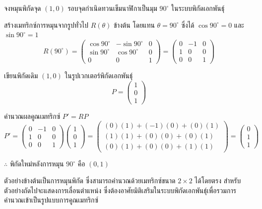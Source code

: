 \begin{ex}[การหมุนพิกัด 2 มิติ]
\label{ex:rotation-2d}
จงหมุนพิกัดจุด $(1, 0)$ รอบจุดกำเนิดทวนเข็มนาฬิกาเป็นมุม $90^\circ$ ในระบบพิกัดเอกพันธุ์
\end{ex}
\begin{solution}
สร้างเมทริกซ์การหมุนจากรูปทั่วไป $R(\theta)$ ข้างต้น โดยแทน $\theta = 90^\circ$ ซึ่งได้ $\cos 90^\circ = 0$ และ $\sin 90^\circ = 1$
\[ R(90^\circ) = \begin{pmatrix} \cos 90^\circ & -\sin 90^\circ & 0 \\ \sin 90^\circ & \cos 90^\circ & 0 \\ 0 & 0 & 1 \end{pmatrix} = \begin{pmatrix} 0 & -1 & 0 \\ 1 & 0 & 0 \\ 0 & 0 & 1 \end{pmatrix} \]

เขียนพิกัดเดิม $(1, 0)$ ในรูปเวกเตอร์พิกัดเอกพันธุ์ \[ P = \begin{pmatrix} 1 \\ 0 \\ 1 \end{pmatrix} \]

คำนวณผลคูณเมทริกซ์ $P' = R P$ \[ P' = \begin{pmatrix} 0 & -1 & 0 \\ 1 & 0 & 0 \\ 0 & 0 & 1 \end{pmatrix} \begin{pmatrix} 1 \\ 0 \\ 1 \end{pmatrix} = \begin{pmatrix} (0)(1)+(-1)(0)+(0)(1) \\ (1)(1)+(0)(0)+(0)(1) \\ (0)(1)+(0)(0)+(1)(1) \end{pmatrix} = \begin{pmatrix} 0 \\ 1 \\ 1 \end{pmatrix} \]

$\therefore$ พิกัดใหม่หลังการหมุน $90^\circ$ คือ $(0, 1)$ \solhere
\end{solution}

ตัวอย่างข้างต้นเป็นการหมุนพิกัด ซึ่งสามารถคำนวณด้วยเมทริกซ์ขนาด $2 \times 2$ ได้โดยตรง สำหรับตัวอย่างถัดไปจะแสดงการเลื่อนตำแหน่ง ซึ่งต้องอาศัยมิติเสริมในระบบพิกัดเอกพันธุ์เพื่อรวมการคำนวณเข้าเป็นรูปแบบการคูณเมทริกซ์

